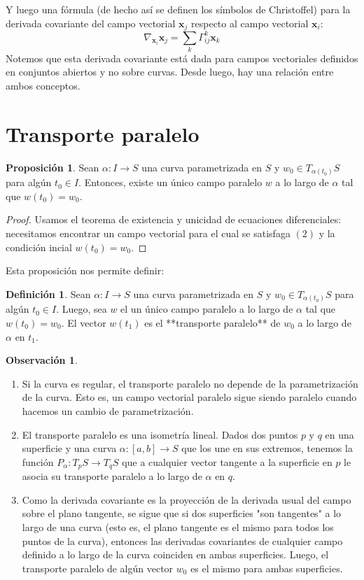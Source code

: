\documentclass[spanish]{book}
\theoremstyle{definition}
\newtheorem*{defn}{Definición}
\newtheorem*{prop}{Proposición}
\newtheorem*{obs}{Observación}
\begin{document}
Y luego una fórmula (de hecho así se definen los símbolos de Christoffel) para la derivada covariante del campo vectorial $\mathbf x_j$ respecto al campo vectorial $\mathbf x_i$:
\[\nabla_{\mathbf x_i}\mathbf x_j=\sum_{k}\Gamma^k_{ij}\mathbf x_k\]
Notemos que esta derivada covariante está dada para campos vectoriales definidos en conjuntos abiertos y no sobre curvas. Desde luego, hay una relación entre ambos conceptos.

\section{Transporte paralelo}
\begin{prop}
	Sean $\alpha:I\to S$ una curva parametrizada en $S$ y $w_0\in T_{\alpha(t_0)}S$  para algún $t_0\in I$. Entonces, existe un único campo paralelo $w$ a lo largo de $\alpha$ tal que $w(t_0)=w_0$.
\end{prop}
\begin{proof}
	Usamos el teorema de existencia y unicidad de ecuaciones diferenciales: necesitamos encontrar un campo vectorial para el cual se satisfaga $(2)$ y la condición incial $w(t_0)=w_0$.
\end{proof}
Esta proposición nos permite definir:
\begin{defn}
	Sean $\alpha:I\to S$ una curva parametrizada en $S$ y $w_0\in T_{\alpha(t_0)}S$  para algún $t_0\in I$. Luego, sea $w$ el un único campo paralelo a lo largo de $\alpha$ tal que $w(t_0)=w_0$. El vector $w(t_1)$ es el **transporte paralelo** de $w_0$ a lo largo de $\alpha$ en $t_1$.
\end{defn}
\begin{obs}\label{obs:superficies-tangentes}\leavevmode
	\begin{enumerate}
		\item Si la curva es regular, el transporte paralelo no depende de la parametrización de la curva. Esto es, un campo vectorial paralelo sigue siendo paralelo cuando hacemos un cambio de parametrización.
		\item El transporte paralelo es una isometría lineal. Dados dos puntos $p$ y $q$ en una superficie y una curva $\alpha:[a,b]\to S$ que los une en sus extremos, tenemos la función $P_\alpha:T_pS\to T_qS$ que a cualquier vector tangente a la superficie en $p$ le asocia su transporte paralelo a lo largo de $\alpha$ en $q$.
		\item Como la derivada covariante es la proyección de la derivada usual del campo sobre el plano tangente, se sigue que si dos superficies "son tangentes" a lo largo de una curva (esto es, el plano tangente es el mismo para todos los puntos de la curva), entonces las derivadas covariantes de cualquier campo definido a lo largo de la curva coinciden en ambas superficies. Luego, el transporte paralelo de algún vector $w_0$ es el mismo para ambas superficies.
	\end{enumerate}
\end{obs}
\end{document}
